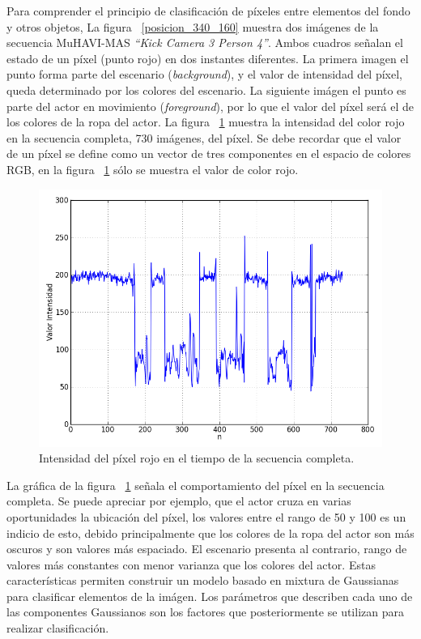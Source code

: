 Para comprender el principio de clasificación de píxeles entre elementos del fondo y otros objetos, La figura ~\ref{posicion_340_160} muestra dos imágenes de la secuencia MuHAVI-MAS \textit{``Kick Camera 3 Person 4''}\cite{singh_muhavi_2010}. Ambos cuadros señalan el estado de un píxel (punto rojo) en dos instantes diferentes. La primera imagen el punto forma parte del escenario (\textit{background}), y el valor de intensidad del píxel, queda determinado por los colores del escenario. La siguiente imágen el punto es parte del actor en movimiento (\textit{foreground}), por lo que el valor del píxel será el de los colores de la ropa del actor. La figura ~\ref{intensidad_340_160} muestra la intensidad del color rojo en la secuencia completa, 730 imágenes, del píxel. Se debe recordar que el valor de un píxel se define como un vector de tres componentes en el espacio de colores RGB, en la figura ~\ref{intensidad_340_160} sólo se muestra el valor de color rojo.

\begin{figure}[h!]
  \centering
      \includegraphics[scale=0.5]{img/figura_3_2}
  \caption[Intensidad en el tiempo de un pixel ]{Intensidad del píxel rojo en el tiempo de la secuencia completa.}
\label{intensidad_340_160}
\end{figure}



La gráfica de la figura ~\ref{intensidad_340_160} señala el comportamiento del píxel en la secuencia completa. Se puede apreciar por ejemplo, que el actor cruza en varias oportunidades la ubicación del píxel, los valores entre el rango de 50 y 100 es un indicio de esto, debido principalmente que los colores de la ropa del actor son más oscuros y son valores más espaciado. El escenario presenta al contrario, rango de valores más constantes con menor varianza que los colores del actor. Estas características permiten construir un modelo basado en mixtura de Gaussianas para clasificar elementos de la imágen. Los parámetros que describen cada uno de las componentes Gaussianos son los factores que posteriormente se utilizan para realizar clasificación. 

